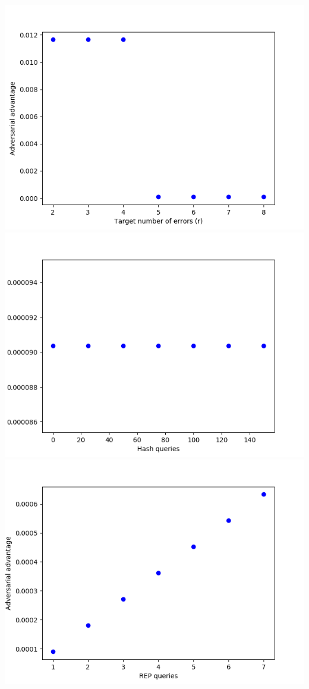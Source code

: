\includegraphics[scale=0.5]{Ct_Figure_4}
\includegraphics[scale=0.5]{Ct_Figure_5}
\includegraphics[scale=0.5]{Ct_Figure_6}
